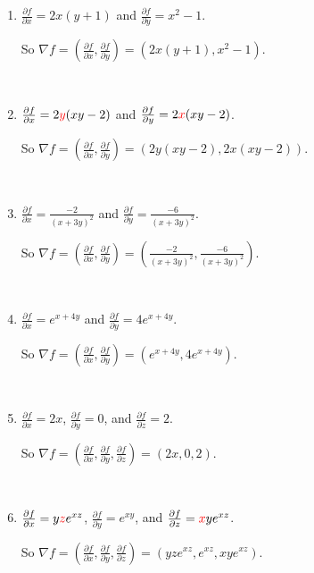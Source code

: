 \begin{enumerate}
    \item 
    $\frac{\partial f}{\partial x} = 2x(y + 1)$ and 
    $\frac{\partial f}{\partial y} = x^2 - 1$. 
    
    So $\nabla f = \left( \frac{\partial f}{\partial x}, \frac{\partial f}{\partial y} \right) = (2x(y + 1), x^2 - 1)$. 

    {~~~}

    \item 
    $\frac{\partial f}{\partial x} = 2{\color{red}y}(xy - 2)$ and 
    $\frac{\partial f}{\partial y} = 2{\color{red}x}(xy - 2)$. 
    
    So $\nabla f = \left( \frac{\partial f}{\partial x}, \frac{\partial f}{\partial y} \right) = (2y(xy - 2), 2x(xy - 2))$. 

    {~~~}

    \item 
    $\frac{\partial f}{\partial x} = \frac{-2}{(x + 3y)^2}$ and 
    $\frac{\partial f}{\partial y} = \frac{-6}{(x + 3y)^2}$. 
    
    So $\nabla f = \left( \frac{\partial f}{\partial x}, \frac{\partial f}{\partial y} \right) = \left( \frac{-2}{(x + 3y)^2}, \frac{-6}{(x + 3y)^2} \right)$. 

    {~~~}

    \item 
    $\frac{\partial f}{\partial x} = e^{x + 4y}$ and 
    $\frac{\partial f}{\partial y} = 4e^{x + 4y}$. 
    
    So $\nabla f = \left( \frac{\partial f}{\partial x}, \frac{\partial f}{\partial y} \right) = (e^{x + 4y}, 4e^{x + 4y})$. 

    {~~~}

    \item 
    $\frac{\partial f}{\partial x} = 2x$, 
    $\frac{\partial f}{\partial y} = 0$, and
    $\frac{\partial f}{\partial z} = 2$. 
    
    So $\nabla f = \left( \frac{\partial f}{\partial x}, \frac{\partial f}{\partial y}, \frac{\partial f}{\partial z} \right) = (2x, 0, 2)$. 

    {~~~}

    \item 
    $\frac{\partial f}{\partial x} = y{\color{red}z}e^{xz}$, 
    $\frac{\partial f}{\partial y} = e^{xy}$, and
    $\frac{\partial f}{\partial z} = {\color{red}x}ye^{xz}$. 
    
    So $\nabla f = \left( \frac{\partial f}{\partial x}, \frac{\partial f}{\partial y}, \frac{\partial f}{\partial z} \right) = (yze^{xz}, e^{xz}, xye^{xz})$. 
\end{enumerate}

